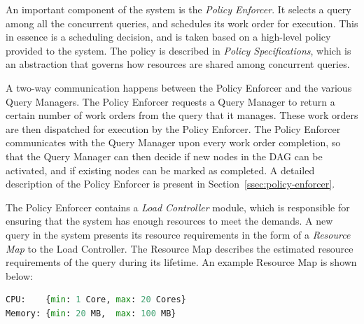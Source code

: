 An important component of the system is the \textit{Policy Enforcer}. 
It selects a query among all the concurrent queries, and schedules its work order for execution. 
This in essence is a scheduling decision, and is taken based on a high-level policy provided to the system.
The policy is described in \textit{Policy Specifications}, which is an
abstraction that governs how resources are shared among concurrent queries. 

A two-way communication happens between the Policy Enforcer and the various Query Managers.
The Policy Enforcer requests a Query Manager to return a certain number of work orders from the query that it manages.
These work orders are then dispatched for execution by the Policy Enforcer. 
The Policy Enforcer communicates with the Query Manager upon every work order
completion, so that the Query Manager can then decide if new nodes in the DAG
can be activated, and if existing nodes can be marked as completed.
A detailed description of the Policy Enforcer is present in Section~\ref{ssec:policy-enforcer}. 

The Policy Enforcer contains a \textit{Load Controller} module, which is
responsible for ensuring that the system has enough resources to meet the
demands.
A new query in the system presents its resource requirements in the form of a
\textit{Resource Map} to the Load Controller.
The Resource Map describes the estimated resource requirements of the query
during its lifetime. 
An example Resource Map is shown below:%
\begin{lstlisting}[language=python, 
								   basicstyle=\ttfamily\small, 
								   showstringspaces=false,
								   keywordstyle=\color{bondiblue}\bfseries, 
								   emph={CPU, Memory}, 
								   emphstyle=\color{cardinal}\bfseries]
CPU:    {min: 1 Core, max: 20 Cores}
Memory: {min: 20 MB,  max: 100 MB}
\end{lstlisting}
\vspace{-0.5em}

